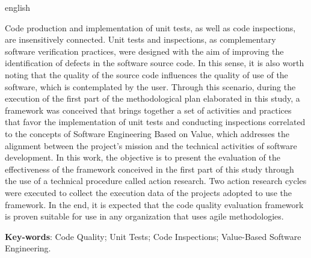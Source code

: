 \begin{resumo}[Abstract]
 \begin{otherlanguage*}{english}

   Code production and implementation of unit tests, as well as code inspections, are insensitively connected. Unit tests and inspections, as complementary software verification practices, were designed with the aim of improving the identification of defects in the software source code. In this sense, it is also worth noting that the quality of the source code influences the quality of use of the software, which is contemplated by the user. Through this scenario, during the execution of the first part of the methodological plan elaborated in this study, a framework was conceived that brings together a set of activities and practices that favor the implementation of unit tests and conducting inspections correlated to the concepts of Software Engineering Based on Value, which addresses the alignment between the project's mission and the technical activities of software development. In this work, the objective is to present the evaluation of the effectiveness of the framework conceived in the first part of this study through the use of a technical procedure called action research. Two action research cycles were executed to collect the execution data of the projects adopted to use the framework. In the end, it is expected that the code quality evaluation framework is proven suitable for use in any organization that uses agile methodologies.

   \vspace{\onelineskip}
 
   \noindent 
   \textbf{Key-words}: Code Quality; Unit Tests; Code Inspections; Value-Based Software Engineering.
 \end{otherlanguage*}
\end{resumo}
